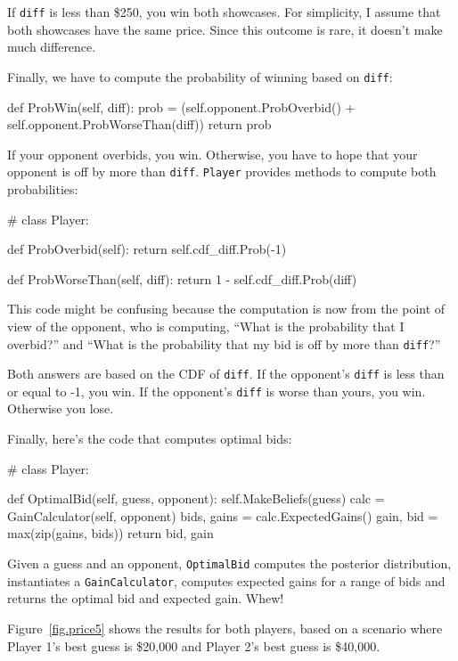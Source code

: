 \documentclass[12pt]{book}
\theoremstyle{exercise}
\begin{document}
If {\tt diff} is less than \$250, you win both showcases.  For
simplicity, I assume that both showcases have the same price.  Since
this outcome is rare, it doesn't make much difference.

Finally, we have to compute the probability of winning based
on {\tt diff}:

\begin{code}
    def ProbWin(self, diff):
        prob = (self.opponent.ProbOverbid() + 
                self.opponent.ProbWorseThan(diff))
        return prob
\end{code}

If your opponent overbids, you win.  Otherwise, you have to hope
that your opponent is off by more than {\tt diff}.  {\tt Player}
provides methods to compute both probabilities:

\begin{code}
# class Player:

    def ProbOverbid(self):
        return self.cdf_diff.Prob(-1)

    def ProbWorseThan(self, diff):
        return 1 - self.cdf_diff.Prob(diff)
\end{code}

This code might be confusing because the computation is now from
the point of view of the opponent, who is computing, ``What is
the probability that I overbid?'' and ``What is the probability
that my bid is off by more than {\tt diff}?''

Both answers are based on the CDF of {\tt diff}.  If the opponent's
{\tt diff} is less than or equal to -1, you win.  If the opponent's
{\tt diff} is worse than yours, you win.  Otherwise you lose.

Finally, here's the code that computes optimal bids:

\begin{code}
# class Player:

    def OptimalBid(self, guess, opponent):
        self.MakeBeliefs(guess)
        calc = GainCalculator(self, opponent)
        bids, gains = calc.ExpectedGains()
        gain, bid = max(zip(gains, bids))
        return bid, gain
\end{code}

Given a guess and an opponent, {\tt OptimalBid} computes
the posterior distribution, instantiates a {\tt GainCalculator},
computes expected gains for a range of bids and returns
the optimal bid and expected gain.  Whew!

Figure~\ref{fig.price5} shows the results for both players,
based on a scenario where Player 1's best guess is \$20,000
and Player 2's best guess is \$40,000.
\end{document}

